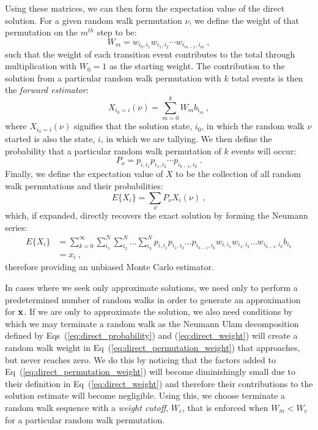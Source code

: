 Using these matrices, we can then form the expectation value of the
direct solution. For a given random walk permutation $\nu$, we define
the weight of that permutation on the $m^{th}$ step to be:
\begin{equation}
  W_{m} = w_{i_0,i_1} w_{i_1,i_2} \cdots w_{i_{m-1},i_m}\:,
  \label{eq:direct_permutation_weight}
\end{equation}
such that the weight of each transition event contributes to the total
through multiplication with $W_0 = 1$ as the starting weight. The
contribution to the solution from a particular random walk permutation
with $k$ total events is then the \textit{forward estimator}:
\begin{equation}
  X_{i_0 = i}(\nu) = \sum_{m=0}^k W_{m} b_{i_m}\:,
  \label{eq:direct_permutation_contribution}
\end{equation}
where $X_{i_0 = i}(\nu)$ signifies that the solution state, $i_0$, in
which the random walk $\nu$ started is also the state, $i$, in which
we are tallying. We then define the probability that a particular
random walk permutation of $k$ events will occur:
\begin{equation}
  P_{\nu} = p_{i,i_1} p_{i_1,i_2} \cdots p_{i_{k-1},i_k}\:.
  \label{eq:direct_permutation_probability}
\end{equation}
Finally, we define the expectation value of $X$ to be the collection
of all random walk permutations and their probabilities:
\begin{equation}
  E\{X_i\} = \sum_{\nu} P_{\nu} X_{i}(\nu)\:,
  \label{eq:direct_expectation_value}
\end{equation}
which, if expanded, directly recovers the exact solution by forming
the Neumann series:
\begin{equation}
  \begin{split}
    E\{X_i\}
    &=\sum_{k=0}^{\infty}\sum_{i_1}^{N}\sum_{i_2}^{N}\ldots
    \sum_{i_k}^{N} p_{i,i_1}p_{i_1,i_2}\ldots p_{i_{k-1},i_k}
    w_{i,i_1}w_{i_1,i_2}\ldots w_{i_{k-1},i_k} b_{i_k}\\ &= x_i\:,
  \end{split}
  \label{eq:direct_expectation_expansion}
\end{equation}
therefore providing an unbiased Monte Carlo estimator. 

In cases where we seek only approximate solutions, we need only to
perform a predetermined number of random walks in order to generate an
approximation for $\mathbf{x}$. If we are only to approximate the
solution, we also need conditions by which we may terminate a random
walk as the Neumann Ulam decomposition defined by
Eqs~(\ref{eq:direct_probability}) and (\ref{eq:direct_weight}) will
create a random walk weight in Eq~(\ref{eq:direct_permutation_weight})
that approaches, but never reaches zero. We do this by noticing that
the factors added to Eq~(\ref{eq:direct_permutation_weight}) will
become diminishingly small due to their definition in
Eq~(\ref{eq:direct_weight}) and therefore their contributions to the
solution estimate will become negligible. Using this, we choose
terminate a random walk sequence with a \textit{weight cutoff}, $W_c$,
that is enforced when $W_m < W_c$ for a particular random walk
permutation.

